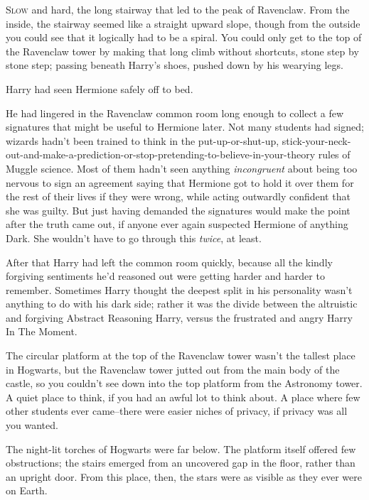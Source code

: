 
\lettrine{S}{low} and hard, the long stairway that led to the peak of Ravenclaw. From the inside, the stairway seemed like a straight upward slope, though from the outside you could see that it logically had to be a spiral. You could only get to the top of the Ravenclaw tower by making that long climb without shortcuts, stone step by stone step; passing beneath Harry's shoes, pushed down by his wearying legs.

Harry had seen Hermione safely off to bed.

He had lingered in the Ravenclaw common room long enough to collect a few signatures that might be useful to Hermione later. Not many students had signed; wizards hadn't been trained to think in the put-up-or-shut-up, stick-your-neck-out-and-make-a-prediction-or-stop-pretending-to-believe-in-your-theory rules of Muggle science. Most of them hadn't seen anything \emph{incongruent} about being too nervous to sign an agreement saying that Hermione got to hold it over them for the rest of their lives if they were wrong, while acting outwardly confident that she was guilty. But just having demanded the signatures would make the point after the truth came out, if anyone ever again suspected Hermione of anything Dark. She wouldn't have to go through this \emph{twice}, at least.

After that Harry had left the common room quickly, because all the kindly forgiving sentiments he'd reasoned out were getting harder and harder to remember. Sometimes Harry thought the deepest split in his personality wasn't anything to do with his dark side; rather it was the divide between the altruistic and forgiving Abstract Reasoning Harry, versus the frustrated and angry Harry In The Moment.

The circular platform at the top of the Ravenclaw tower wasn't the tallest place in Hogwarts, but the Ravenclaw tower jutted out from the main body of the castle, so you couldn't see down into the top platform from the Astronomy tower. A quiet place to think, if you had an awful lot to think about. A place where few other students ever came\---there were easier niches of privacy, if privacy was all you wanted.

The night-lit torches of Hogwarts were far below. The platform itself offered few obstructions; the stairs emerged from an uncovered gap in the floor, rather than an upright door. From this place, then, the stars were as visible as they ever were on Earth.

